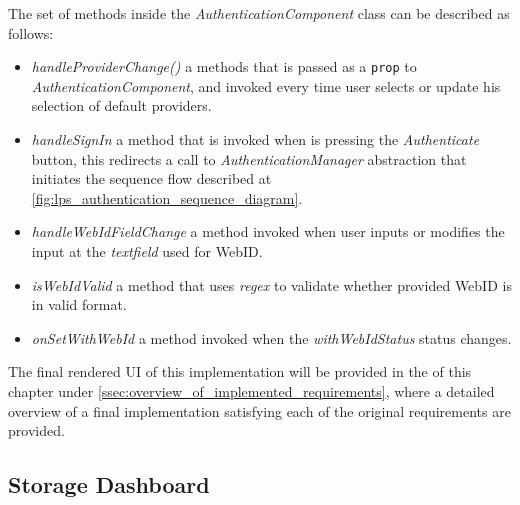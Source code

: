 The set of methods inside the \textit{AuthenticationComponent} class can be described as follows:
\begin{itemize}
    \item \textit{handleProviderChange()} a methods that is passed as a \texttt{prop} to \textit{AuthenticationComponent}, and invoked every time user selects or update his selection of default providers.
    \item \textit{handleSignIn} a method that is invoked when is pressing the \textit{Authenticate} button, this redirects a call to \textit{AuthenticationManager} abstraction that initiates the sequence flow described at \autoref{fig:lps_authentication_sequence_diagram}.
    \item \textit{handleWebIdFieldChange} a method invoked when user inputs or modifies the input at the \textit{textfield} used for WebID.
    \item \textit{isWebIdValid} a method that uses \textit{regex} to validate whether provided WebID is in valid format.
    \item \textit{onSetWithWebId} a method invoked when the \textit{withWebIdStatus} status changes.  
\end{itemize}

The final rendered UI of this implementation will be provided in the of this chapter under \autoref{ssec:overview_of_implemented_requirements}, where a detailed overview of a final implementation satisfying each of the original \lpa{} requirements are provided.

\subsection{Storage Dashboard}
\label{sssec:storage_dashboard_implementation}

